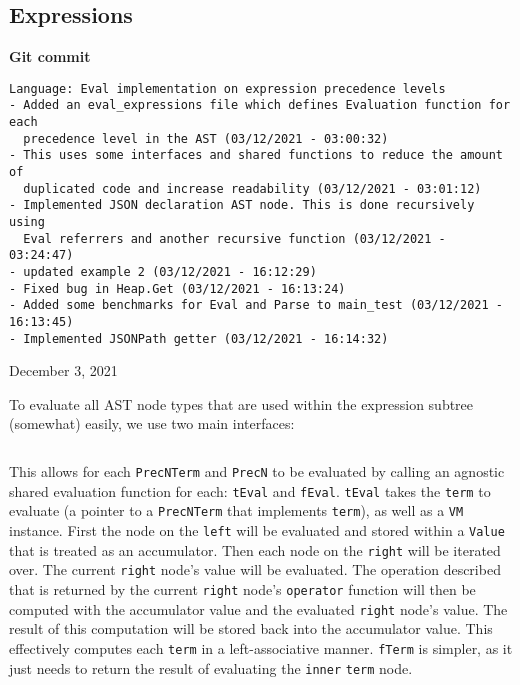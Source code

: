 \subsection{Expressions}
\label{sec:development-ast-nodes-expressions}

\begin{center}
    \textbf{Git commit}
    \begin{verbatim}
Language: Eval implementation on expression precedence levels
- Added an eval_expressions file which defines Evaluation function for each
  precedence level in the AST (03/12/2021 - 03:00:32)
- This uses some interfaces and shared functions to reduce the amount of
  duplicated code and increase readability (03/12/2021 - 03:01:12)
- Implemented JSON declaration AST node. This is done recursively using
  Eval referrers and another recursive function (03/12/2021 - 03:24:47)
- updated example 2 (03/12/2021 - 16:12:29)
- Fixed bug in Heap.Get (03/12/2021 - 16:13:24)
- Added some benchmarks for Eval and Parse to main_test (03/12/2021 - 16:13:45)
- Implemented JSONPath getter (03/12/2021 - 16:14:32)
    \end{verbatim}
    \vspace{-1em}
    \tiny{December 3, 2021}
\end{center}

To evaluate all AST node types that are used within the expression subtree (somewhat) easily, we use two main interfaces:

\inputminted[firstline=13, lastline=30, autogobble, breaklines, tabsize=4]{go}{../../src/parser/eval_expression.go}

This allows for each \verb|PrecNTerm| and \verb|PrecN| to be evaluated by calling an agnostic shared evaluation function for each: \verb|tEval| and \verb|fEval|. \verb|tEval| takes the \verb|term| to evaluate (a pointer to a \verb|PrecNTerm| that implements \verb|term|), as well as a \verb|VM| instance. First the node on the \verb|left| will be evaluated and stored within a \verb|Value| that is treated as an accumulator. Then each node on the \verb|right| will be iterated over. The current \verb|right| node's value will be evaluated. The operation described that is returned by the current \verb|right| node's \verb|operator| function will then be computed with the accumulator value and the evaluated \verb|right| node's value. The result of this computation will be stored back into the accumulator value. This effectively computes each \verb|term| in a left-associative manner. \verb|fTerm| is simpler, as it just needs to return the result of evaluating the \verb|inner| \verb|term| node.

